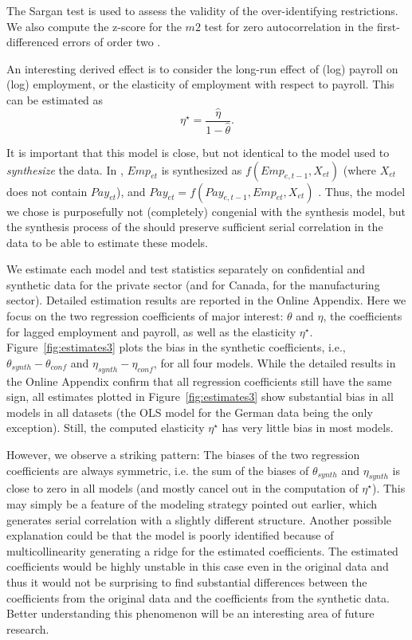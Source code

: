 The Sargan test \parencite{hansen_large_1982,RePEc:oup:restud:v:58:y:1991:i:2:p:277-297.,blundell_estimation_2001} is used to assess the validity of the over-identifying restrictions. We also compute the z-score for the $m2$ test for zero autocorrelation in the  first-differenced errors of order two \parencite{RePEc:oup:restud:v:58:y:1991:i:2:p:277-297.}. 

An interesting derived effect is to consider the long-run effect of (log) payroll on (log) employment, or the elasticity of employment with respect to payroll. This can be estimated as
$$
\eta^\star = \frac{\hat{\eta}}{1-\hat{\theta}}.
$$

It is important that this model is close, but not identical to the model used to \textit{synthesize} the data. In \SynLBD, $Emp_{et}$ is synthesized as $f(Emp_{e,t-1},X_{et})$ (where $X_{et}$ does not contain $Pay_{et}$), and $Pay_{et} = f(Pay_{e,t-1},Emp_{et},X_{et})$ \citep[pg. 366]{KinneyEtAl2011}. Thus, the model we chose is purposefully not (completely) congenial with the synthesis model, but the synthesis process of the \SynLBD{} should preserve sufficient serial correlation in the data to be able to estimate these models.

We estimate each model and test statistics separately on confidential and synthetic data for the private sector (and for Canada, for the manufacturing sector). Detailed estimation results are reported in the Online Appendix. Here we  focus on the two regression coefficients of major interest: $\theta$ and $\eta$, the coefficients for lagged employment and payroll, as well as the elasticity $\eta^\star$. Figure~\ref{fig:estimates3} plots the bias in the synthetic coefficients, i.e., $\theta_{synth}-\theta_{conf}$ and $\eta_{synth}-\eta_{conf}$, for all four models. While the detailed results in the Online Appendix confirm that all regression coefficients still have the same sign, all estimates plotted in Figure~\ref{fig:estimates3} show substantial bias in all models in all datasets (the OLS model for the German data being the only exception). Still, the computed elasticity $\eta^\star$ has very little bias in most models.




However, we observe a striking pattern: The biases of the two regression coefficients are always symmetric, i.e. the sum of the biases of $\theta_{synth}$ and $\eta_{synth}$ is close to zero in all models (and mostly cancel out in the computation of $\eta^\star$). 
This may simply be a feature of the modeling strategy pointed out earlier, which generates serial correlation with a slightly different structure. Another possible explanation could be that the model is poorly identified because of multicollinearity generating a ridge for the estimated coefficients. The estimated coefficients would be highly unstable in this case even in the original data and thus it would not be surprising to find substantial differences between the coefficients from the original data and the coefficients from the synthetic data. Better understanding this phenomenon will be an interesting area of future research.

